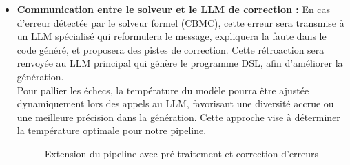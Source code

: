 \documentclass[a4paper,11pt]{article}
\begin{document}
\begin{itemize}

    \item \textbf{Communication entre le solveur et le LLM de correction :}  
    En cas d'erreur détectée par le solveur formel (CBMC), cette erreur sera transmise à un LLM spécialisé qui reformulera le message, expliquera la faute dans le code généré, et proposera des pistes de correction. Cette rétroaction sera renvoyée au LLM principal qui génère le programme DSL, afin d'améliorer la génération.\\  
    Pour pallier les échecs, la température du modèle pourra être ajustée dynamiquement lors des appels au LLM, favorisant une diversité accrue ou une meilleure précision dans la génération. Cette approche vise à déterminer la température optimale pour notre pipeline.

    \begin{figure}[h!]
\centering
{}
\caption{Extension du pipeline avec pré-traitement et correction d'erreurs}
\label{fig:pipeline_extension}
\end{figure}



\end{itemize}
\end{document}
